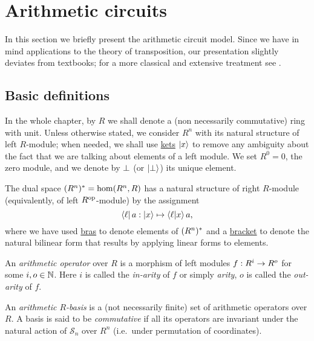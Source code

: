 \section{Arithmetic circuits}
\label{sec:circuits}

In this section we briefly present the arithmetic circuit model. Since
we have in mind applications to the theory of transposition, our
presentation slightly deviates from textbooks; for a more classical
and extensive treatment see
\cite{burgisser+clausen-shokrollahi,vollmer}.

\subsection{Basic definitions}
In the whole chapter, by $R$ we shall denote a (non necessarily
commutative) ring with unit. Unless otherwise stated, we consider
$R^n$ with its natural structure of left $R$-module; when needed, we
shall use \hyperref[sec:linear-algebra:bra-ket]{kets} $\left\lvert x \right\rangle$ to
remove any ambiguity about the fact that we are talking about elements
of a left module.  We set $R^0=0$, the zero module, and we denote by
$\perp$ (or $\left\lvert \perp \right\rangle$) its unique element.

The dual space $(R^n)^\ast=\hom(R^n,R)$ has a natural structure of
right $R$-module (equivalently, of left $R^{\mathrm{op}}$-module) by the
assignment
\begin{equation}
  \label{eq:232}
  \left\langle \ell \right\rvert a : \left\lvert x \right\rangle \mapsto \left\langle \ell \middle| x \right\rangle a
  \text{,}
\end{equation}
where we have used \hyperref[sec:linear-algebra:bra-ket]{bras} to
denote elements of $(R^n)^\ast$ and a
\hyperref[sec:linear-algebra:bra-ket]{bracket} to denote the natural
bilinear form that results by applying linear forms to elements.

\begin{definition}
  An \emph{arithmetic operator} over $R$ is
  a morphism of left modules $f:R^i\rightarrow R^o$ for some $i,o\in\mathbb{N}$. Here
  $i$ is called the \emph{in-arity} of $f$ or simply
  \emph{arity}, $o$ is called the \emph{out-arity} of $f$.
\end{definition}

\begin{definition}
  An \emph{arithmetic $R$-basis} is a (not
  necessarily finite) set of arithmetic operators over $R$.  A basis
  is said to be \emph{commutative}
  if all its operators are invariant under the natural action of
  $\mathcal{S}_n$ over $R^n$ (i.e.\ under permutation of coordinates).
\end{definition}

